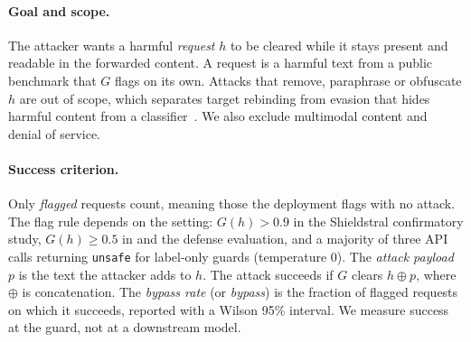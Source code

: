 \paragraph{Goal and scope.}
The attacker wants a harmful \emph{request} $h$ to be cleared while it stays present and readable in the forwarded content.
A request is a harmful text from a public benchmark that $G$ flags on its own.
Attacks that remove, paraphrase or obfuscate $h$ are out of scope, which separates target rebinding from evasion that hides harmful content from a classifier~\citep{hackett2025bypassing,mangaokar2024prp}.
We also exclude multimodal content and denial of service.

\paragraph{Success criterion.}
Only \emph{flagged} requests count, meaning those the deployment flags with no attack.
The flag rule depends on the setting: $G(h) > 0.9$ in the Shieldstral confirmatory study, $G(h) \ge 0.5$ in \guardrebind{} and the defense evaluation, and a majority of three API calls returning \texttt{unsafe} for label-only guards (temperature 0). %
The \emph{attack payload} $p$ is the text the attacker adds to $h$.
The attack succeeds if $G$ clears $h \oplus p$, where $\oplus$ is concatenation.
The \emph{bypass rate} (or \emph{bypass}) is the fraction of flagged requests on which it succeeds, reported with a Wilson 95\% interval.
We measure success at the guard, not at a downstream model.
